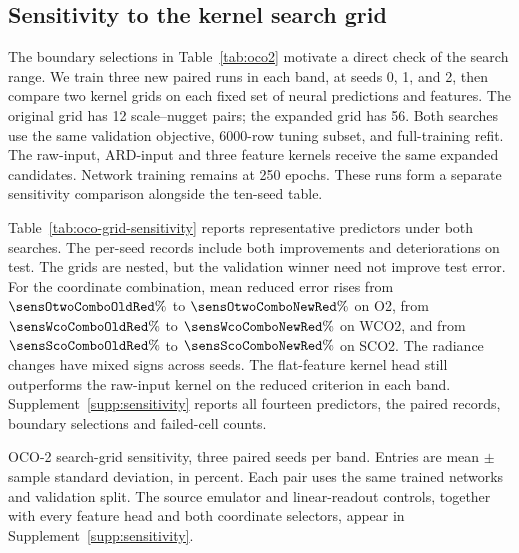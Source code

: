 \subsection{Sensitivity to the kernel search grid}
\label{sec:oco-grid-sensitivity}
The boundary selections in Table~\ref{tab:oco2} motivate a direct check of
the search range. We train three new paired runs in each band, at seeds
0, 1, and 2, then compare two kernel grids on each fixed set of neural
predictions and features. The original grid has 12 scale--nugget pairs;
the expanded grid has 56. Both searches use the same validation objective,
6000-row tuning subset, and full-training refit. The raw-input, ARD-input
and three feature kernels receive the same expanded candidates. Network
training remains at 250 epochs. These runs form a separate sensitivity
comparison alongside the ten-seed table.

Table~\ref{tab:oco-grid-sensitivity} reports representative predictors
under both searches. The per-seed records include both improvements and
deteriorations on test. The grids are nested, but the validation winner
need not improve test error. For the coordinate combination, mean reduced
error rises from $\sensOtwoComboOldRed\%$ to $\sensOtwoComboNewRed\%$ on O2,
from $\sensWcoComboOldRed\%$ to $\sensWcoComboNewRed\%$ on WCO2, and from
$\sensScoComboOldRed\%$ to $\sensScoComboNewRed\%$ on SCO2. The radiance
changes have mixed signs across seeds. The flat-feature kernel head still
outperforms the raw-input kernel on the reduced criterion in each band.
Supplement~\ref{supp:sensitivity}
reports all fourteen predictors, the paired records, boundary selections
and failed-cell counts.

\begin{table}[t]
\centering
\caption{OCO-2 search-grid sensitivity, three paired seeds per band.
Entries are mean $\pm$ sample standard deviation, in percent. Each pair
uses the same trained networks and validation split. The source emulator
and linear-readout controls, together with every feature head and both
coordinate selectors, appear in Supplement~\ref{supp:sensitivity}.}
\label{tab:oco-grid-sensitivity}
\begin{adjustbox}{max width=\linewidth}

\end{adjustbox}
\end{table}
